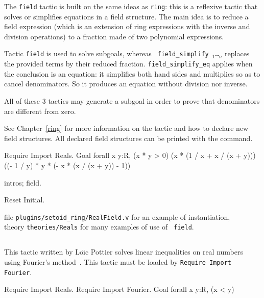 The {\tt field} tactic is built on the same ideas as {\tt ring}: this
is a reflexive tactic that solves or simplifies equations in a field
structure. The main idea is to reduce a field expression (which is an
extension of ring expressions with the inverse and division
operations) to a fraction made of two polynomial expressions.

Tactic {\tt field} is used to solve subgoals, whereas {\tt
  field\_simplify \term$_1$\dots\term$_n$} replaces the provided terms
by their reduced fraction. {\tt field\_simplify\_eq} applies when the
conclusion is an equation: it simplifies both hand sides and multiplies
so as to cancel denominators. So it produces an equation without
division nor inverse.

All of these 3 tactics may generate a subgoal in order to prove that
denominators are different from zero.

See Chapter~\ref{ring} for more information on the tactic and how to
declare new field structures.  All declared field structures can be
printed with the {} command.

\Example
\begin{coq_example*}
Require Import Reals.
Goal forall x y:R,
    (x * y > 0)%
    (x * (1 / x + x / (x + y)))%
    ((- 1 / y) * y * (- x * (x / (x + y)) - 1))%
\end{coq_example*}

\begin{coq_example}
intros; field.
\end{coq_example}

\begin{coq_eval}
Reset Initial.
\end{coq_eval}

\SeeAlso file {\tt plugins/setoid\_ring/RealField.v} for an example of instantiation,\\
\phantom{\SeeAlso}theory {\tt theories/Reals} for many examples of use of {\tt
field}.

\subsection{}

This tactic written by Lo{\"\i}c Pottier solves linear inequalities on
real numbers using Fourier's method~\cite{Fourier}. This tactic must
be loaded by {\tt Require Import Fourier}.

\Example
\begin{coq_example*}
Require Import Reals.
Require Import Fourier.
Goal forall x y:R, (x < y)%
\end{coq_example*}

